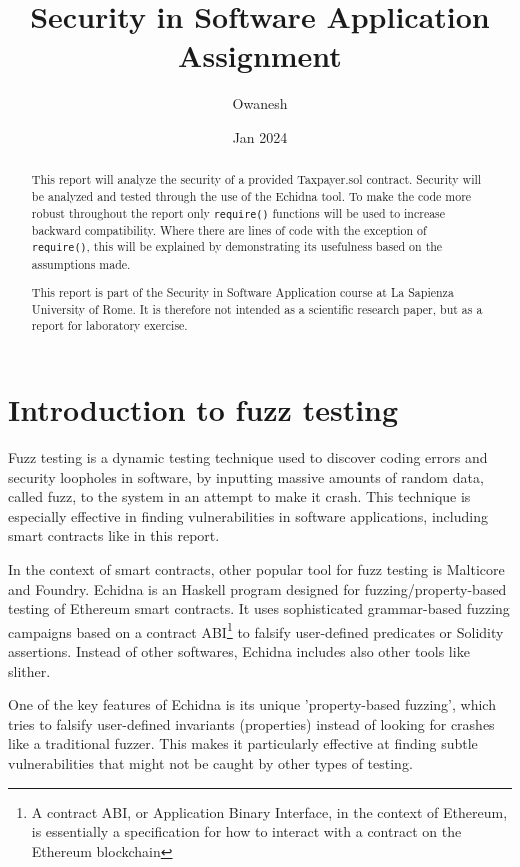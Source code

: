 \documentclass{article}
\title{Security in Software Application Assignment}
\author{Owanesh}
\date{Jan 2024}
\begin{document}
\maketitle

\begin{abstract}
    This report will analyze the security of a provided Taxpayer.sol 
    contract. Security will be analyzed and tested through the use of 
    the Echidna tool. To make the code more robust throughout the report 
    only \texttt{require()} functions will be used to 
    increase backward compatibility. Where there are lines of code with 
    the exception of \texttt{require()}, this will be 
    explained by demonstrating its usefulness based on the assumptions made.

    This report is part of the Security in Software Application course at La Sapienza University of Rome. It is therefore not intended as a scientific research paper, but as a report for laboratory exercise.
\end{abstract}


\section{Introduction to fuzz testing}
Fuzz testing is a dynamic testing technique used to discover coding 
errors and security loopholes in software, by inputting massive amounts 
of random data, called fuzz, to the system in an attempt to make it crash. 
This technique is especially effective in finding vulnerabilities in 
software applications, including smart contracts like in this report.

In the context of smart contracts, other popular tool for 
fuzz testing is Malticore and Foundry. Echidna is an Haskell program designed 
for fuzzing/property-based testing of Ethereum smart contracts. 
It uses sophisticated grammar-based fuzzing campaigns based 
on a contract ABI\footnote{A contract ABI, or Application Binary Interface, in the context of Ethereum, is essentially a specification for how to interact with a contract on the Ethereum blockchain} to falsify user-defined predicates or Solidity assertions.
Instead of other softwares, Echidna includes also other tools like slither.

One of the key features of Echidna is its unique 'property-based fuzzing',
 which tries to falsify user-defined invariants (properties) 
 instead of looking for crashes like a traditional fuzzer. 
 This makes it particularly effective at finding subtle vulnerabilities that might not be caught by other types of testing.
\end{document}
